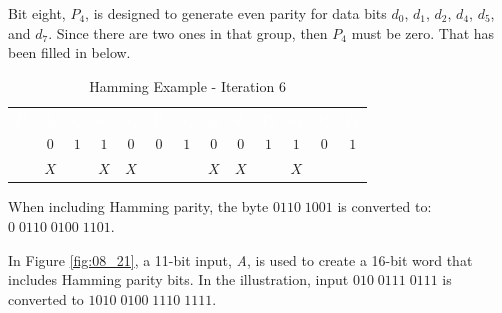 Bit eight, $ P_4 $, is designed to generate even parity for data bits $ d_0 $, $ d_1 $, $ d_2 $, $ d_4 $, $ d_5 $, and $ d_7 $. Since there are two ones in that group, then $ P_4 $ must be zero. That has been filled in below. 

\begin{table}[H]
  \sffamily
  \newcommand{\head}[1]{\textcolor{white}{\textbf{#1}}}		
  \begin{center}
    \begin{tabular}{ccccccccccccc} 
      \rowcolor{black!75}
      \head{$ P_4 $} & \head{$ d_7 $} & \head{$ d_6 $} &
      \head{$ d_5 $} & \head{$ d_4 $} & \head{$ P_3 $} &
      \head{$ d_3 $} & \head{$ d_2 $} & \head{$ d_1 $} &
      \head{$ P_2 $} & \head{$ d_0 $} & \head{$ P_1 $} &
      \head{$ P_0 $} \\
      \color{red}{$ 0 $} & $ 0 $ & $ 1 $ &
      $ 1 $ & $ 0 $ & $ 0 $ &
      $ 1 $ & $ 0 $ & $ 0 $ &
      $ 1 $ & $ 1 $ & $ 0 $ &
      $ 1 $ \\
      \color{red}{$ P $} & $ X $ & \color{gray}{$ 0 $} &
      $ X $ & $ X $ & \color{gray}{$ 0 $} &
      \color{gray}{$ 0 $} & $ X $ & $ X $ &
      \color{gray}{$ 0 $} & $ X $ & \color{gray}{$ 0 $} &
      \color{gray}{$ 0 $} 
    \end{tabular}
  \end{center}
  \caption{Hamming Example - Iteration 6}
  \label{cl:tab:hamming_example_iteration_6}
\end{table}

When including Hamming parity, the byte $ 0110 \; 1001 $ is converted to: $ 0 \; 0110 \; 0100 \; 1101 $.

In Figure \ref{fig:08_21}, a 11-bit input, \emph{A}, is used to create a 16-bit word that includes Hamming parity bits. In the illustration, input $ 010 \; 0111 \; 0111 $ is converted to $ 1010 \; 0100 \; 1110 \; 1111 $.  

